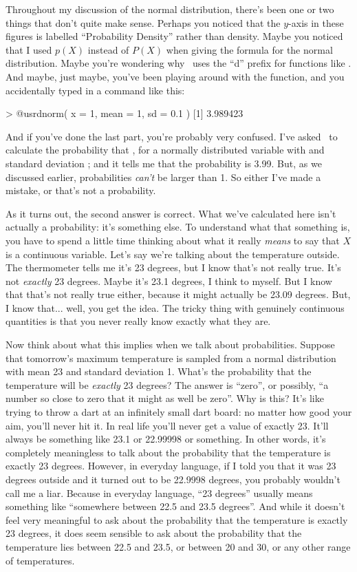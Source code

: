 Throughout my discussion of the normal distribution, there's been one or two things that don't quite make sense. Perhaps you noticed that the $y$-axis in these figures is labelled ``Probability Density'' rather than density. Maybe you noticed that I used $p(X)$ instead of $P(X)$ when giving the formula for the normal distribution. Maybe you're wondering why \R\ uses the ``d'' prefix for functions like . And maybe, just maybe, you've been playing around with the  function, and you accidentally typed in a command like this:
\begin{rblock1}
> @usr{dnorm( x = 1, mean = 1, sd = 0.1 )}
[1] 3.989423
\end{rblock1}
And if you've done the last part, you're probably very confused. I've asked \R\ to calculate the probability that , for a normally distributed variable with  and standard deviation ; and it tells me that the probability is 3.99. But, as we discussed earlier, probabilities {\it can't} be larger than 1. So either I've made a mistake, or that's not a probability. 

As it turns out, the second answer is correct. What we've calculated here isn't actually a probability: it's something else. To understand what that something is, you have to spend a little time thinking about what it really {\it means} to say that $X$ is a continuous variable. Let's say we're talking about the temperature outside. The thermometer tells me it's 23 degrees, but I know that's not really true. It's not {\it exactly} 23 degrees. Maybe it's 23.1 degrees, I think to myself. But I know that that's not really true either, because it might actually be 23.09 degrees. But, I know that... well, you get the idea. The tricky thing with genuinely continuous quantities is that you never really know exactly what they are.

Now think about what this implies when we talk about probabilities. Suppose that tomorrow's maximum temperature is sampled from a normal distribution with mean 23 and standard deviation 1. What's the probability that the temperature will be {\it exactly} 23 degrees? The answer is ``zero'', or possibly, ``a number so close to zero that it might as well be zero''. Why is this? It's like trying to throw a dart at an infinitely small dart board: no matter how good your aim, you'll never hit it. In real life you'll never get a value of exactly 23. It'll always be something like 23.1 or 22.99998 or something. In other words, it's completely meaningless to talk about the probability that the temperature is exactly 23 degrees. However, in everyday language, if I told you that it was 23 degrees outside and it turned out to be 22.9998 degrees, you probably wouldn't call me a liar. Because in everyday language, ``23 degrees'' usually means something like ``somewhere between 22.5 and 23.5 degrees''. And while it doesn't feel very meaningful to ask about the probability that the temperature is exactly 23 degrees, it does seem sensible to ask about the probability that the temperature lies between 22.5 and 23.5, or between 20 and 30, or any other range of temperatures. 

